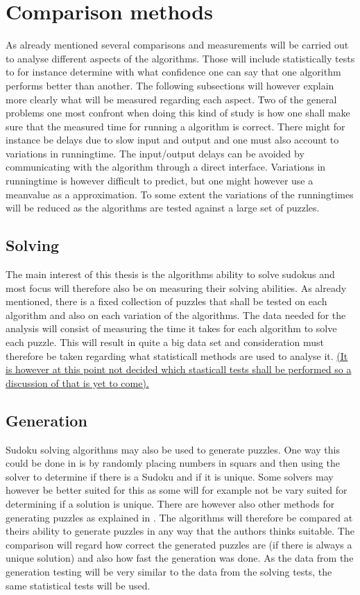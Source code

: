 \documentclass[a4paper,11pt]{kth-mag}
\begin{document}
\section{Comparison methods}
As already mentioned several comparisons and measurements will be carried out to 
analyse different aspects of the algorithms.
Those will include statistically tests 
to for instance determine with what confidence one can say that one algorithm performs 
better than another. 
The following subsections will however explain more clearly what will be measured 
regarding each aspect. 
Two of the general problems one most confront when doing this kind of study is how one 
shall make sure that the measured time for  running a algorithm is correct. 
There might for instance be delays due to slow input and output and one must also account 
to variations in runningtime. 
The input/output delays can be avoided by communicating with the algorithm through a 
direct interface. 
Variations in runningtime is however difficult to predict, but one might however use a 
meanvalue as a approximation. 
To some extent the variations of the runningtimes will be reduced as the algorithms are tested against a large set of puzzles.  

\subsection{Solving}
The main interest of this thesis is the algorithms ability to solve sudokus and most focus will therefore also be on measuring their solving abilities.
As already mentioned, there is a fixed collection of puzzles that shall be tested on each algorithm and also on each variation of the algorithms.
The data needed for the analysis will consist of measuring the time it takes for each algorithm to solve each puzzle.
This will result in quite a big data set and consideration must therefore be taken regarding what statisticall methods are used to analyse it. 
\underline{(It is however at this point not decided which stasticall tests shall be performed so a discussion of that is yet to come).}

\subsection{Generation}
Sudoku solving algorithms may also be used to generate puzzles.
One way this could be done in is by randomly placing numbers in squars and then using the solver to determine if there is a Sudoku and if it is unique.
Some solvers may however be better suited for this as some will for example not be vary suited for determining if a solution is unique.
There are however also other methods for generating puzzles as explained in \cite{generation}.
The algorithms will therefore be compared at theirs ability to generate puzzles in any way that the authors thinks suitable.
The comparison will regard how correct the generated puzzles are (if there is always a unique solution) and also how fast the generation was done.
As the data from the generation testing will be very similar to the data from the solving tests, the same statistical tests will be used.
\end{document}
